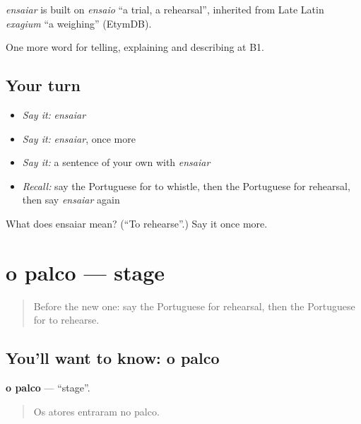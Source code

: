 \begin{cousinweb}
\emph{ensaiar} is built on \emph{ensaio} \textquotedblleft{}a trial, a rehearsal\textquotedblright{}, inherited from Late Latin \emph{exagium} \textquotedblleft{}a weighing\textquotedblright{} (EtymDB).
\end{cousinweb}

\begin{grammarlens}[title={What you've built}]
One more word for telling, explaining and describing at B1.
\end{grammarlens}

\subsection*{Your turn}
\begin{itemize}
\raggedright
  \item \emph{Say it:} \emph{ensaiar}
  \item \emph{Say it:} \emph{ensaiar}, once more
  \item \emph{Say it:} a sentence of your own with \emph{ensaiar}
  \item \emph{Recall:} say the Portuguese for to whistle, then the Portuguese for rehearsal, then say \emph{ensaiar} again
\end{itemize}

\begin{tcolorbox}[breakable,colback=teal!4,colframe=teal!35!black,title={Before you move on}]
What does ensaiar mean? (\textquotedblleft{}To rehearse\textquotedblright{}.) Say it once more.
\end{tcolorbox}
\section[o palco]{o palco — stage}

\label{lesson:PT-C519-palco}



\begin{quote}
Before the new one: say the Portuguese for rehearsal, then the Portuguese for to rehearse.
\end{quote}

\subsection*{You'll want to know: o palco}
\textbf{o palco} — \textquotedblleft{}stage\textquotedblright{}.

\begin{quote}
Os atores entraram no palco.
\end{quote}

